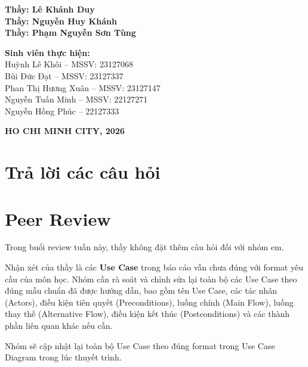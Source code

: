 \documentclass[a4paper,12pt]{article}
\begin{document}
\begin{titlepage}
\begin{center}
    
    \vspace{1.5cm}

    \begin{tcolorbox}[colback=blue!5!white, colframe=blue!50!black, width=0.9\textwidth, boxrule=0.8pt, arc=3pt, left=8pt, right=8pt]
        \textbf{Thầy: Lê Khánh Duy}\\
        \textbf{Thầy: Nguyễn Huy Khánh}\\
        \textbf{Thầy: Phạm Nguyễn Sơn Tùng}
    \end{tcolorbox}
    \vspace{1cm}

    \begin{tcolorbox}[colback=gray!10!white, colframe=gray!60!black, width=0.9\textwidth, boxrule=0.8pt, arc=3pt, left=8pt, right=8pt]
        \textbf{Sinh viên thực hiện:} \\
        Huỳnh Lê Khôi -- MSSV: 23127068 \\ 
        Bùi Đức Đạt -- MSSV: 23127337 \\
        Phan Thị Hương Xuân -- MSSV: 23127147 \\
        Nguyễn Tuấn Minh -- MSSV: 22127271 \\
        Nguyễn Hồng Phúc -- 22127333
        
    \end{tcolorbox}

    \vfill
    {\large\textbf{HO CHI MINH CITY, 2026}}
\end{center}
\end{titlepage}
\newpage
\section*{Trả lời các câu hỏi}

\section*{Peer Review}

Trong buổi review tuần này, thầy không đặt thêm câu hỏi đối với nhóm em.

Nhận xét của thầy là các \textbf{Use Case} trong báo cáo vẫn chưa đúng với format yêu cầu của môn học. Nhóm cần rà soát và chỉnh sửa lại toàn bộ các Use Case theo đúng mẫu chuẩn đã được hướng dẫn, bao gồm tên Use Case, các tác nhân (Actors), điều kiện tiên quyết (Preconditions), luồng chính (Main Flow), luồng thay thế (Alternative Flow), điều kiện kết thúc (Postconditions) và các thành phần liên quan khác nếu cần.

Nhóm sẽ cập nhật lại toàn bộ Use Case theo đúng format trong Use Case Diagram trong lúc thuyết trình.
\end{document}
